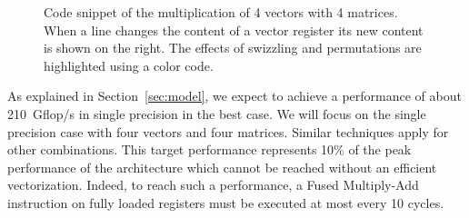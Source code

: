 \documentclass[10pt,conference,compsocconf]{IEEEtran}
\begin{document}
\begin{figure}
  \centering
{}%

\caption{Code snippet of the multiplication of 4 vectors with 4
  matrices. When a line changes the content of a vector register its
  new content is shown on the right. The effects of swizzling and
  permutations are highlighted using a color code.}
\label{code:mat_mul}
\end{figure}



As explained in Section~\ref{sec:model}, we expect to achieve a performance of
about 210~Gflop/s in single precision in the best case. We will focus
on the single precision case with four vectors and four matrices. 
Similar techniques apply for other combinations. This target
performance represents 10\% of the peak performance of the
architecture which cannot be reached without an efficient vectorization. Indeed, to reach such a performance, a Fused Multiply-Add
instruction on fully loaded registers must be executed at most every
10 cycles.
\end{document}

